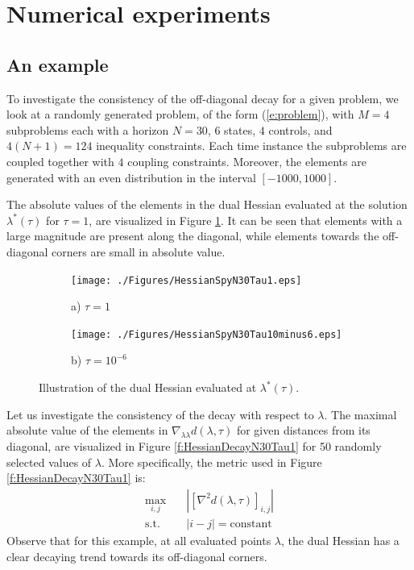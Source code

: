 \section{Numerical experiments}

\subsection{An example}
To investigate the consistency of the off-diagonal decay for a given problem, we look at a randomly generated problem, of the form (\ref{e:problem}), with $M=4$ subproblems each with a horizon $N=30$, $6$ states, $4$ controls, and $4(N+1) = 124$ inequality constraints. Each time instance the subproblems are coupled together with $4$ coupling constraints. Moreover, the elements are generated with an even distribution in the interval $[-1000, 1000]$.

The absolute values of the elements in the dual Hessian evaluated at the solution $\lambda^*(\tau)$ for $\tau=1$, are visualized in Figure \ref{f:HessianSpyN30Tau1}. It can be seen that elements with a large magnitude are present along the diagonal, while elements towards the off-diagonal corners are small in absolute value.

\begin{figure}[h]
\centering
\begin{subfigure}{.5\linewidth}
  \centering
  \texttt{[image: ./Figures/HessianSpyN30Tau1.eps]}
  \caption{a) $\tau = 1$}
  \label{f:HessianSpyN30Tau1}
\end{subfigure}%
\begin{subfigure}{.5\linewidth}
  \centering
  \texttt{[image: ./Figures/HessianSpyN30Tau10minus6.eps]}
  \caption{b) $\tau = 10^{-6}$}
  \label{f:HessianSpyN30Tau10minus6}
\end{subfigure}
\caption{Illustration of the dual Hessian evaluated at $\lambda^*(\tau)$.}
\label{fig:test}
\end{figure}

Let us investigate the consistency of the decay with respect to $\lambda$. The maximal absolute value of the elements in $\nabla_{\lambda\lambda} d(\lambda, \tau)$ for given distances from its diagonal, are visualized in Figure \ref{f:HessianDecayN30Tau1} for 50 randomly selected values of $\lambda$. More specifically, the metric used in Figure \ref{f:HessianDecayN30Tau1} is:
\begin{equation}
\begin{aligned}
\max_{i,j} & \quad | [\nabla^2 d(\lambda,\tau)]_{i,j} | \\
\text{s.t.} & \quad |i - j| = \text{constant}
\end{aligned}
\end{equation}
Observe that for this example, at all evaluated points $\lambda$, the dual Hessian has a clear decaying trend towards its off-diagonal corners.

